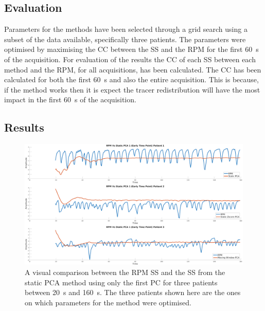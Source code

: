             \subsection{Evaluation} \label{sec:pca_data_driven_surrogate_signal_extraction_methods_for_dynamic_pet_methods_evaluation}
                Parameters for the methods have been selected through a grid search using a subset of the data available, specifically three patients. The parameters were optimised by maximising the \gls{CC} between the \gls{SS} and the \gls{RPM} for the first \SI{60}{\second} of the acquisition. For evaluation of the results the \gls{CC} of each \gls{SS} between each method and the \gls{RPM}, for all acquisitions, has been calculated. The \gls{CC} has been calculated for both the first \SI{60}{\second} and also the entire acquisition. This is because, if the method works then it is expect the tracer redistribution will have the most impact in the first \SI{60}{\second} of the acquisition.
            
        \subsection{Results} \label{sec:pca_data_driven_surrogate_signal_extraction_methods_for_dynamic_pet_results}
            \begin{figure}
                \centering
                
                \includegraphics[width=1.0\linewidth]{figures/data_driven_surrogate_signal_extraction_results_1_vanilla_surrogate_signal.png}
                
                \captionsetup{singlelinecheck=false, justification=centering}
                \caption{A visual comparison between the \gls{RPM} \gls{SS} and the \gls{SS} from the static \gls{PCA} method using only the first \gls{PC} for three patients between \SI{20}{\second} and \SI{160}{\second}. The three patients shown here are the ones on which parameters for the method were optimised.}
                \label{fig:pca_data_driven_surrogate_signal_extraction_methods_for_dynamic_pet_results_vanilla_surrogate_signal}
            \end{figure}
            

